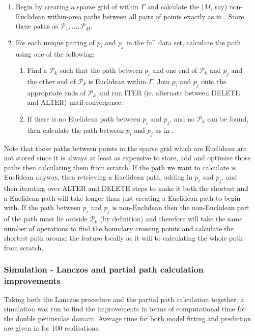 \begin{enumerate}
 \item Begin by creating a sparse grid of within $\Gamma$ and calculate the ($M$, say) non-Euclidean within-area paths between all pairs of points exactly as in . Store these paths as $\mathcal{P}_1,\ldots, \mathcal{P}_M$.
\item For each unique pairing of $p_i$ and $p_j$ in the full data set, calculate the path using one of the following:
	\begin{enumerate}
	\item Find a $\mathcal{P}_k$ such that the path between $p_i$ and one end of $\mathcal{P}_k$ and $p_j$ and the other end of $\mathcal{P}_k$ is Euclidean within $\Gamma$. Join $p_i$ and $p_j$ onto the appropriate ends of $\mathcal{P}_k$ and run ITER (ie. alternate between DELETE and ALTER) until convergence.
	\item If there is no Euclidean path between $p_i$ and $p_j$, and no $\mathcal{P}_k$ can be found, then calculate the path between $p_i$ and $p_j$ as in . 
	\end{enumerate}
\end{enumerate}

Note that those paths between points in the sparse grid which are Euclidean are not stored since it is always at least as expensive to store, add and optimise those paths then calculating them from scratch. If the path we want to calculate is Euclidean anyway, then retrieving a Euclidean path, adding in $p_i$ and $p_j$, and then iterating over ALTER and DELETE steps to make it both the shortest and a Euclidean path will take longer than just creating a Euclidean path to begin with. If the path between $p_i$ and $p_j$ is non-Euclidean then the non-Euclidean part of the path must lie outside $\mathcal{P}_k$ (by definition) and therefore will take the same number of operations to find the boundary crossing points and calculate the shortest path around the feature locally as it will to calculating the whole path from scratch.


\subsubsection{Simulation - Lanczos and partial path calculation improvements}

Taking both the Lanczos procedure and the partial path calculation together, a simulation was run to find the improvements in terms of computational time for the double peninsulae domain. Average time for both model fitting and prediction are given in  for 100 realisations. 

